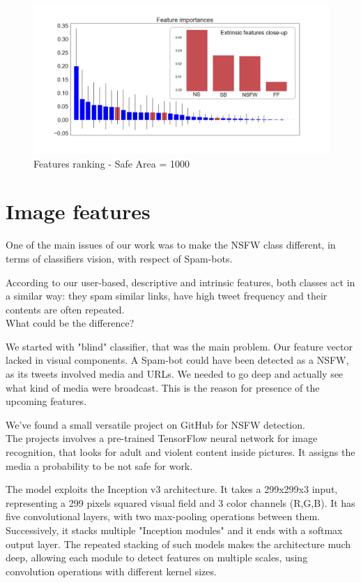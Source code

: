 \begin{figure}[htp!]
	\includegraphics[width=\columnwidth]{chapter4/figure/features_importances_1000.png}
	\caption{Features ranking - Safe Area = 1000}
	\label{fig:1000_overall}
\end{figure}


\section{Image features}
One of the main issues of our work was to make the NSFW class different, in terms of classifiers vision, with respect of Spam-bots.

According to our user-based, descriptive and intrinsic features, both classes act in a similar way: they spam similar links, have high tweet frequency and their contents are often repeated.\\
What could be the difference?

We started with "blind" classifier, that was the main problem. Our feature vector lacked in visual components. A Spam-bot could have been detected as a NSFW, as its tweets involved media and URLs. We needed to go deep and actually see what kind of media were broadcast.
This is the reason for presence of the upcoming features.

We've found a small versatile project on GitHub for NSFW detection.\\
The projects involves a pre-trained TensorFlow neural network for image recognition, that looks for adult and violent content inside pictures. It assigns the media a probability to be not safe for work.

The model exploits the Inception v3 \cite{inception} architecture.
It takes a 299x299x3 input, representing a 299 pixels squared visual field and 3 color channels (R,G,B). It has five convolutional layers, with two max-pooling operations between them. Successively, it stacks multiple "Inception modules" and it ends with a softmax output layer.
The repeated stacking of such models makes the architecture much deep, allowing each module to detect features on multiple scales, using convolution operations with different kernel sizes.


